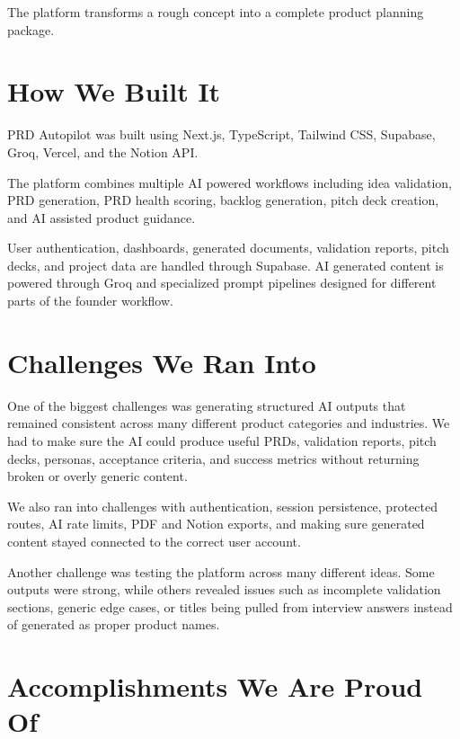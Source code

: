 \documentclass[11pt]{article}
\begin{document}
The platform transforms a rough concept into a complete product planning package.

\section{How We Built It}

PRD Autopilot was built using Next.js, TypeScript, Tailwind CSS, Supabase, Groq, Vercel, and the Notion API.

The platform combines multiple AI powered workflows including idea validation, PRD generation, PRD health scoring, backlog generation, pitch deck creation, and AI assisted product guidance.

User authentication, dashboards, generated documents, validation reports, pitch decks, and project data are handled through Supabase. AI generated content is powered through Groq and specialized prompt pipelines designed for different parts of the founder workflow.

\section{Challenges We Ran Into}

One of the biggest challenges was generating structured AI outputs that remained consistent across many different product categories and industries. We had to make sure the AI could produce useful PRDs, validation reports, pitch decks, personas, acceptance criteria, and success metrics without returning broken or overly generic content.

We also ran into challenges with authentication, session persistence, protected routes, AI rate limits, PDF and Notion exports, and making sure generated content stayed connected to the correct user account.

Another challenge was testing the platform across many different ideas. Some outputs were strong, while others revealed issues such as incomplete validation sections, generic edge cases, or titles being pulled from interview answers instead of generated as proper product names.

\section{Accomplishments We Are Proud Of}
\end{document}
